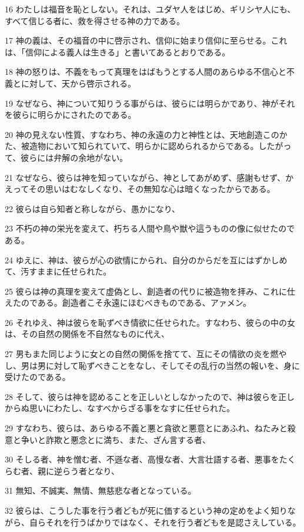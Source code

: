 \par 16 わたしは福音を恥としない。それは、ユダヤ人をはじめ、ギリシヤ人にも、すべて信じる者に、救を得させる神の力である。
\par 17 神の義は、その福音の中に啓示され、信仰に始まり信仰に至らせる。これは、「信仰による義人は生きる」と書いてあるとおりである。
\par 18 神の怒りは、不義をもって真理をはばもうとする人間のあらゆる不信心と不義とに対して、天から啓示される。
\par 19 なぜなら、神について知りうる事がらは、彼らには明らかであり、神がそれを彼らに明らかにされたのである。
\par 20 神の見えない性質、すなわち、神の永遠の力と神性とは、天地創造このかた、被造物において知られていて、明らかに認められるからである。したがって、彼らには弁解の余地がない。
\par 21 なぜなら、彼らは神を知っていながら、神としてあがめず、感謝もせず、かえってその思いはむなしくなり、その無知な心は暗くなったからである。
\par 22 彼らは自ら知者と称しながら、愚かになり、
\par 23 不朽の神の栄光を変えて、朽ちる人間や鳥や獣や這うものの像に似せたのである。
\par 24 ゆえに、神は、彼らが心の欲情にかられ、自分のからだを互にはずかしめて、汚すままに任せられた。
\par 25 彼らは神の真理を変えて虚偽とし、創造者の代りに被造物を拝み、これに仕えたのである。創造者こそ永遠にほむべきものである、アァメン。
\par 26 それゆえ、神は彼らを恥ずべき情欲に任せられた。すなわち、彼らの中の女は、その自然の関係を不自然なものに代え、
\par 27 男もまた同じように女との自然の関係を捨てて、互にその情欲の炎を燃やし、男は男に対して恥ずべきことをなし、そしてその乱行の当然の報いを、身に受けたのである。
\par 28 そして、彼らは神を認めることを正しいとしなかったので、神は彼らを正しからぬ思いにわたし、なすべからざる事をなすに任せられた。
\par 29 すなわち、彼らは、あらゆる不義と悪と貪欲と悪意とにあふれ、ねたみと殺意と争いと詐欺と悪念とに満ち、また、ざん言する者、
\par 30 そしる者、神を憎む者、不遜な者、高慢な者、大言壮語する者、悪事をたくらむ者、親に逆らう者となり、
\par 31 無知、不誠実、無情、無慈悲な者となっている。
\par 32 彼らは、こうした事を行う者どもが死に価するという神の定めをよく知りながら、自らそれを行うばかりではなく、それを行う者どもを是認さえしている。

